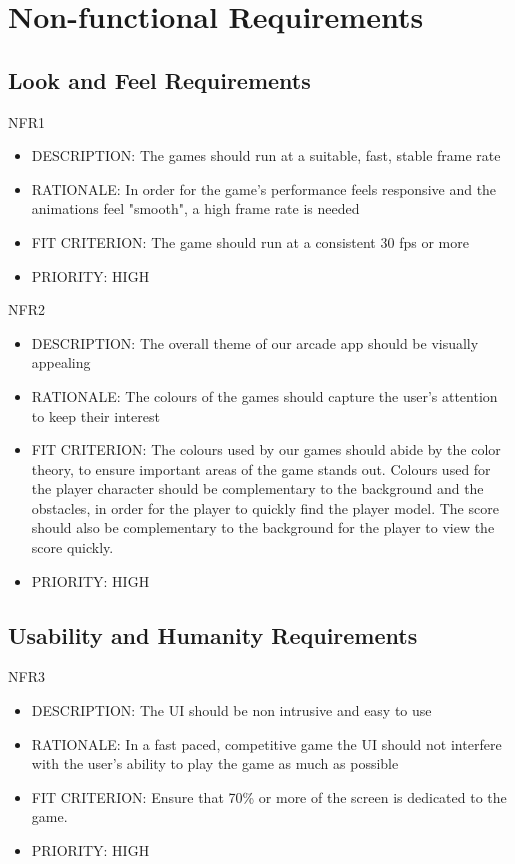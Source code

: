 \documentclass[12pt, titlepage]{article}
\begin{document}
\section{Non-functional Requirements}
\subsection{Look and Feel Requirements}
NFR1
\begin{itemize}
    \item DESCRIPTION: The games should run at a suitable, fast, stable frame rate 
    \item RATIONALE: In order for the game's performance feels responsive and the animations feel "smooth", a high frame rate is needed
    \item FIT CRITERION: The game should run at a consistent 30 fps or more
    \item PRIORITY: HIGH
\end{itemize}

NFR2 
\begin{itemize}
    \item DESCRIPTION: The overall theme of our arcade app should be visually appealing
    \item RATIONALE: The colours of the games should capture the user's attention to keep their interest 
    \item FIT CRITERION: The colours used by our games should abide by the color theory, to ensure important areas of the game stands out. Colours used for the player character should be complementary to the background and the obstacles, in order for the player to quickly find the player model. The score should also be complementary to the background for the player to view the score quickly. 
    \item PRIORITY: HIGH
\end{itemize}


\subsection{Usability and Humanity Requirements}
NFR3
\begin{itemize}
    \item DESCRIPTION: The UI should be non intrusive and easy to use
    \item RATIONALE: In a fast paced, competitive game the UI should not interfere with the user's 
ability to play the game as much as possible
    \item FIT CRITERION: Ensure that 70\% or more of the screen is dedicated to the game.
    \item PRIORITY: HIGH
\end{itemize}
\end{document}
